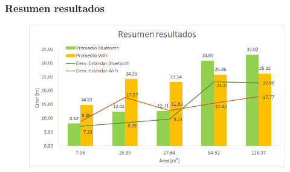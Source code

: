 \documentclass[mathserif]{beamer}
\begin{document}

\begin{frame}
\frametitle{Resumen resultados}

\begin{figure}
\includegraphics[width=\textwidth]{../figures_chesta/resultados/summary}
\end{figure}




\end{frame}
\end{document}
